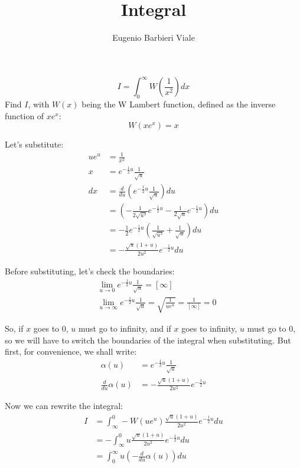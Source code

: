 \documentclass[12pt]{article}
\title{Integral}
\author{Eugenio Barbieri Viale}
\begin{document}
\setlength{\parindent}{0pt}

\maketitle

$$ I = \int_0^\infty W\left(\frac{1}{x^2}\right)dx $$
Find $I$, with $W(x)$ being the W Lambert function, defined as the inverse function of $xe^x$:
$$ W(xe^x) = x $$

Let's substitute:
\begin{align}
    ue^u &= \frac{1}{x^2} \\
    x &= e^{-\frac{1}{2}u}\frac{1}{\sqrt{u}} \\
    dx &= \frac{d}{du}\left(e^{-\frac{1}{2}u}\frac{1}{\sqrt{u}}\right)du \\
       &= \left(-\frac{1}{2\sqrt{u^3}}e^{-\frac{1}{2}u}-\frac{1}{2\sqrt{u}}e^{-\frac{1}{2}u}\right)du \\
       &= -\frac{1}{2}e^{-\frac{1}{2}u}\left(\frac{1}{\sqrt{u^3}} + \frac{1}{\sqrt{u}}\right)du \\
       &= -\frac{\sqrt{u}(1+u)}{2u^2}e^{-\frac{1}{2}u}du
\end{align}

Before substituting, let's check the boundaries:
\begin{align}
    &\lim_{u\to0} e^{-\frac{1}{2}u}\frac{1}{\sqrt{u}} = [\infty] \\
    &\lim_{u\to\infty} e^{-\frac{1}{2}u}\frac{1}{\sqrt{u}} = \sqrt{\frac{1}{ue^u}} = \frac{1}{[\infty]} = 0
\end{align}

So, if $x$ goes to $0$, $u$ must go to infinity, and if $x$ goes to infinity, $u$ must go to $0$, so we will have to switch the boundaries of the integral when substituting. But first, for convenience, we shall write:
\begin{align}
    \alpha(u) &= e^{-\frac{1}{2}u}\frac{1}{\sqrt{u}} \\
    \frac{d}{du}\alpha(u) &= -\frac{\sqrt{u}(1+u)}{2u^2}e^{-\frac{1}{2}u}
\end{align}

Now we can rewrite the integral:
\begin{align}
    I &= \int_\infty^0 -W\left(ue^u\right)\frac{\sqrt{u}(1+u)}{2u^2}e^{-\frac{1}{2}u}du \\
      &= -\int_\infty^0 u\frac{\sqrt{u}(1+u)}{2u^2}e^{-\frac{1}{2}u}du \\
      &= \int_0^\infty u \left(-\frac{d}{du}\alpha(u)\right)du
\end{align}
\end{document}
